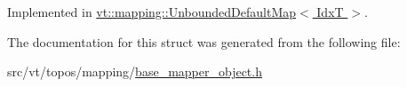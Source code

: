 Implemented in \hyperlink{structvt_1_1mapping_1_1_unbounded_default_map_a8617e6a789985a7140d09a8be6bc3a47}{vt\+::mapping\+::\+Unbounded\+Default\+Map$<$ Idx\+T $>$}.



The documentation for this struct was generated from the following file\+:\begin{DoxyCompactItemize}
\item 
src/vt/topos/mapping/\hyperlink{base__mapper__object_8h}{base\+\_\+mapper\+\_\+object.\+h}\end{DoxyCompactItemize}
